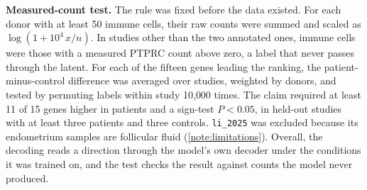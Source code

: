 \textbf{Measured-count test.} The rule was fixed before the data existed.
For each donor with at least 50 immune cells, their raw counts were summed and scaled
as $\log(1 + 10^{4}\,x/n)$. In studies other than the two annotated ones,
immune cells were those with a measured PTPRC count above zero, a label
that never passes through the latent. For each of the fifteen genes
leading the ranking, the patient-minus-control difference was averaged
over studies, weighted by donors, and tested by permuting labels within
study 10{,}000 times. The claim required at least 11 of 15 genes higher in
patients and a sign-test $P < 0.05$, in held-out studies with at least
three patients and three controls. \texttt{li\_2025} was excluded because
its endometrium samples are follicular fluid (\ref{note:limitations}).
Overall, the decoding reads a direction through the model's own decoder
under the conditions it was trained on, and the test checks the result
against counts the model never produced.
